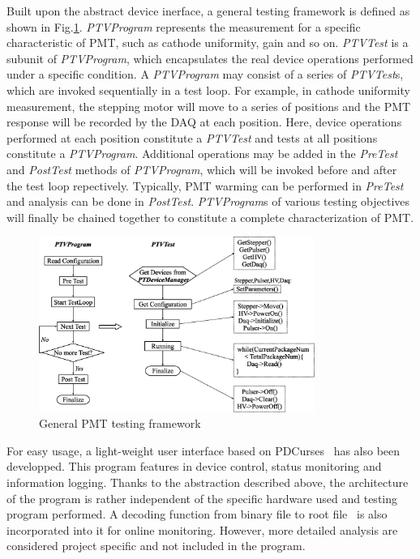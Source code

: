 \documentclass[5p, times]{elsarticle}
\begin{document}
Built upon the abstract device inerface, a general testing framework is defined as shown in Fig.\ref{fig:software_framework}.
\textit{PTVProgram} represents the measurement for a specific characteristic of PMT, such as cathode uniformity, gain and so on.
\textit{PTVTest} is a subunit of \textit{PTVProgram}, which encapsulates the real device operations performed under a specific condition.
A \textit{PTVProgram} may consist of a series of \textit{PTVTest}s, which are invoked sequentially in a test loop.
For example, in cathode uniformity measurement, the stepping motor will move to a series of positions and the PMT response will be recorded by the DAQ at each position.
Here, device operations performed at each position constitute a \textit{PTVTest} and tests at all positions constitute a \textit{PTVProgram}.
Additional operations may be added in the \textit{PreTest} and \textit{PostTest} methods of \textit{PTVProgram}, which will be invoked before and after the test loop repectively.
Typically, PMT warming can be performed in \textit{PreTest} and analysis can be done in \textit{PostTest}.
\textit{PTVProgram}s of various testing objectives will finally be chained together to constitute a complete characterization of PMT.

\begin{figure}
  \centering
 \includegraphics[width=90mm]{software_framework}
\caption{General PMT testing framework}
\label{fig:software_framework}
\end{figure}

For easy usage, a light-weight user interface based on PDCurses~\cite{pdcurses} has also been developped.
This program features in device control, status monitoring and information logging.
Thanks to the abstraction described above, the architecture of the program is rather independent of the specific hardware used and testing program performed.
A decoding function from binary file to root file~\cite{root} is also incorporated into it for online monitoring.
However, more detailed analysis are considered project specific and not included in the program. 
\end{document}
